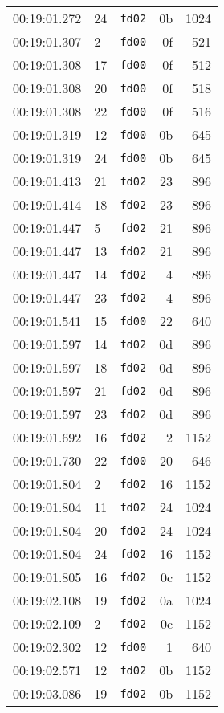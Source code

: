 \documentclass{article}
\begin{document}
\begin{longtable}{lllrr}
00:19:01.272 & 24 & \texttt{fd02} & 0b & 1024 \\
00:19:01.307 & 2 & \texttt{fd00} & 0f & 521 \\
00:19:01.308 & 17 & \texttt{fd00} & 0f & 512 \\
00:19:01.308 & 20 & \texttt{fd00} & 0f & 518 \\
00:19:01.308 & 22 & \texttt{fd00} & 0f & 516 \\
00:19:01.319 & 12 & \texttt{fd00} & 0b & 645 \\
00:19:01.319 & 24 & \texttt{fd00} & 0b & 645 \\
00:19:01.413 & 21 & \texttt{fd02} & 23 & 896 \\
00:19:01.414 & 18 & \texttt{fd02} & 23 & 896 \\
00:19:01.447 & 5 & \texttt{fd02} & 21 & 896 \\
00:19:01.447 & 13 & \texttt{fd02} & 21 & 896 \\
00:19:01.447 & 14 & \texttt{fd02} & 4 & 896 \\
00:19:01.447 & 23 & \texttt{fd02} & 4 & 896 \\
00:19:01.541 & 15 & \texttt{fd00} & 22 & 640 \\
00:19:01.597 & 14 & \texttt{fd02} & 0d & 896 \\
00:19:01.597 & 18 & \texttt{fd02} & 0d & 896 \\
00:19:01.597 & 21 & \texttt{fd02} & 0d & 896 \\
00:19:01.597 & 23 & \texttt{fd02} & 0d & 896 \\
00:19:01.692 & 16 & \texttt{fd02} & 2 & 1152 \\
00:19:01.730 & 22 & \texttt{fd00} & 20 & 646 \\
00:19:01.804 & 2 & \texttt{fd02} & 16 & 1152 \\
00:19:01.804 & 11 & \texttt{fd02} & 24 & 1024 \\
00:19:01.804 & 20 & \texttt{fd02} & 24 & 1024 \\
00:19:01.804 & 24 & \texttt{fd02} & 16 & 1152 \\
00:19:01.805 & 16 & \texttt{fd02} & 0c & 1152 \\
00:19:02.108 & 19 & \texttt{fd02} & 0a & 1024 \\
00:19:02.109 & 2 & \texttt{fd02} & 0c & 1152 \\
00:19:02.302 & 12 & \texttt{fd00} & 1 & 640 \\
00:19:02.571 & 12 & \texttt{fd02} & 0b & 1152 \\
00:19:03.086 & 19 & \texttt{fd02} & 0b & 1152 \\

\end{longtable}
\end{document}
